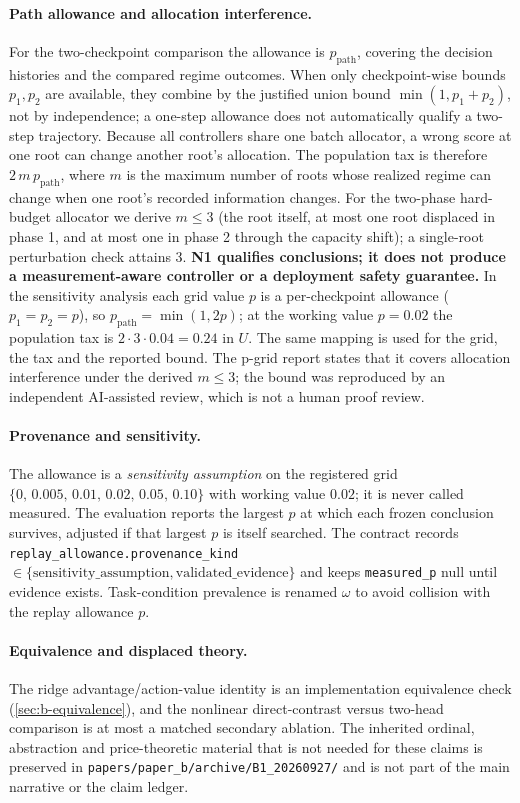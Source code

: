 \paragraph{Path allowance and allocation interference.}
For the two-checkpoint comparison the allowance is $p_{\text{path}}$, covering
the decision histories and the compared regime outcomes.  When only
checkpoint-wise bounds $p_1,p_2$ are available, they combine by the justified
union bound $\min(1,p_1+p_2)$, not by independence; a one-step allowance does not
automatically qualify a two-step trajectory.  Because all controllers share one
batch allocator, a wrong score at one root can change another root's allocation.
The population tax is therefore $2\,m\,p_{\text{path}}$, where $m$ is the maximum
number of roots whose realized regime can change when one root's recorded
information changes.  For the two-phase hard-budget allocator we derive $m\le 3$
(the root itself, at most one root displaced in phase 1, and at most one in phase
2 through the capacity shift); a single-root perturbation check attains 3.
\textbf{N1 qualifies conclusions; it does not produce a measurement-aware
controller or a deployment safety guarantee.}  In the sensitivity analysis each
grid value $p$ is a per-checkpoint allowance ($p_1=p_2=p$), so
$p_{\text{path}}=\min(1,2p)$; at the working value $p=0.02$ the population tax is
$2\cdot 3\cdot 0.04=0.24$ in $U$.  The same mapping is used for the grid, the
tax and the reported bound.  The p-grid report states that it covers allocation
interference under the derived $m\le 3$; the bound was reproduced by an
independent AI-assisted review, which is not a human proof review.

\paragraph{Provenance and sensitivity.}
The allowance is a \emph{sensitivity assumption} on the registered grid
$\{0,\,0.005,\,0.01,\,0.02,\,0.05,\,0.10\}$ with working value $0.02$; it is
never called measured.  The evaluation reports the largest $p$ at which each
frozen conclusion survives, adjusted if that largest $p$ is itself searched.
The contract records
\texttt{replay\_allowance.provenance\_kind}$\in\{\text{sensitivity\_assumption},\allowbreak
\text{validated\_evidence}\}$ and keeps \texttt{measured\_p} null until evidence
exists.  Task-condition prevalence is renamed $\omega$ to avoid collision with
the replay allowance $p$.

\paragraph{Equivalence and displaced theory.}
The ridge advantage/action-value identity is an implementation equivalence check
(\cref{sec:b-equivalence}), and the nonlinear direct-contrast versus two-head
comparison is at most a matched secondary ablation.  The inherited ordinal,
abstraction and price-theoretic material that is not needed for these claims is
preserved in \texttt{papers/paper\_b/archive/B1\_20260927/} and is not part of
the main narrative or the claim ledger.
